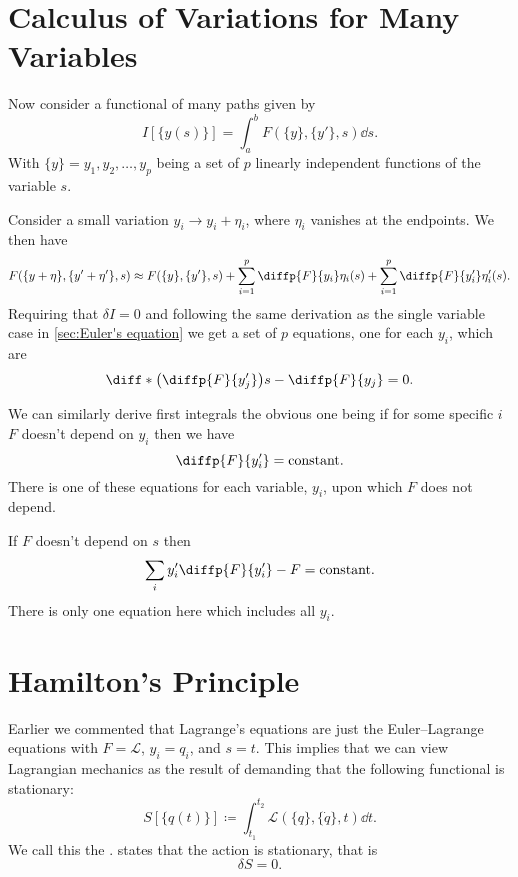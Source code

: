 \documentclass[fleqn]{NotesClass}
\newcommand*{\lagrangian}{\mathcal{L}}
\begin{document}
    \section{Calculus of Variations for Many Variables}
    Now consider a functional of many paths given by
    \begin{equation}
        I[\{y(s)\}] = \int_a^b F(\{y\}, \{y'\}, s) \dd{s}.
    \end{equation}
    With \(\{y\} = y_1, y_2, \dotsc, y_p\) being a set of \(p\) linearly independent functions of the variable \(s\).
    
    Consider a small variation \(y_i \to y_i + \eta_i\), where \(\eta_i\) vanishes at the endpoints.
    We then have
    \begin{equation}
        F(\{y + \eta\}, \{y' + \eta'\}, s) \approx F(\{y\}, \{y'\}, s) + \sum_{i=1}^{p} \diffp{F}{y_i}\eta_i(s) + \sum_{i=1}^{p} \diffp{F}{y_i'}\eta_i'(s).
    \end{equation}
    Requiring that \(\delta I = 0\) and following the same derivation as the single variable case in \cref{sec:Euler's equation} we get a set of \(p\) equations, one for each \(y_i\), which are
    \begin{equation}
        \diff*{\left( \diffp{F}{y_j'} \right)}{s} - \diffp{F}{y_j} = 0.
    \end{equation}
    
    We can similarly derive first integrals the obvious one being if for some specific \(i\) \(F\) doesn't depend on \(y_i\) then we have
    \begin{equation}
        \diffp{F}{y_i'} = \text{constant.}
    \end{equation}
    There is one of these equations for each variable, \(y_i\), upon which \(F\) does not depend.
    
    If \(F\) doesn't depend on \(s\) then
    \begin{equation}\label{eqn:first integral second kind multivariable}
        \sum_i y_i'\diffp{F}{y_i'} - F = \text{constant.}
    \end{equation}
    There is only one equation here which includes all \(y_i\).
    
    \section{Hamilton's Principle}
    Earlier we commented that Lagrange's equations are just the Euler--Lagrange equations with \(F = \lagrangian\), \(y_i = q_i\), and \(s = t\).
    This implies that we can view Lagrangian mechanics as the result of demanding that the following functional is stationary:
    \begin{equation}
        S[\{q(t)\}] \coloneqq \int_{t_1}^{t_2} \! \lagrangian(\{q\}, \{\dot{q}\}, t) \dd{t}.
    \end{equation}
    We call this the .
     states that the action is stationary, that is
    \begin{equation}
        \delta S = 0.
    \end{equation}
    
\end{document}
